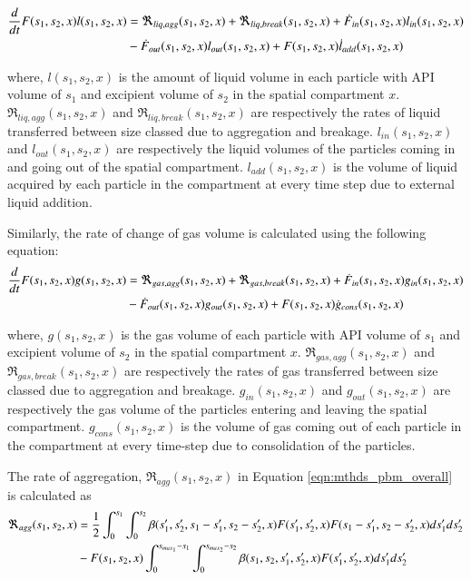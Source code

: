 \documentclass[preprint,11pt,authoryear]{elsarticle}
\begin{document}
\begin{align}
\frac{d}{dt}F(s_1,s_2,x)l(s_1,s_2,x)&= 
\Re_{liq,agg}(s_1,s_2,x)+\Re_{liq,break}(s_1,s_2,x)+\dot{F}_{in}(s_1,s_2,x)l_{in}(s_1,s_2,x)\notag\\
&-\dot{F}_{out}(s_1,s_2,x)l_{out}(s_1,s_2,x)+F(s_1,s_2,x)\dot{l}_{add}(s_1,s_2,x)
\end{align}

\par where, $l(s_1,s_2,x)$ is the amount of liquid volume in each particle with API volume of $s_1$ and 
excipient volume of $s_2$ in the spatial compartment $x$. $\Re_{liq,agg}(s_1,s_2,x)$ and 
$\Re_{liq,break}(s_1,s_2,x)$ are respectively the rates of liquid transferred between size classed due to 
aggregation and breakage. $l_{in}(s_1,s_2,x)$ and $l_{out}(s_1,s_2,x)$ are respectively the liquid 
volumes of the particles coming in and going out of the spatial compartment. $l_{add}(s_1,s_2,x)$ is 
the volume of liquid acquired by each particle in the compartment at every time step due to external 
liquid addition. 
\par Similarly, the rate of change of gas volume is calculated using the following equation: 
\begin{align}
\frac{d}{dt}F(s_1,s_2,x)g(s_1,s_2,x)&= 
\Re_{gas,agg}(s_1,s_2,x)+\Re_{gas,break}(s_1,s_2,x)+\dot{F}_{in}(s_1,s_2,x)g_{in}(s_1,s_2,x)\notag\\
&-\dot{F}_{out}(s_1,s_2,x)g_{out}(s_1,s_2,x)+F(s_1,s_2,x)\dot{g}_{cons}(s_1,s_2,x)
\end{align}

\par where, $g(s_1,s_2,x)$ is the gas volume of each particle with API volume of $s_1$ and excipient 
volume of $s_2$ in the spatial compartment $x$. $\Re_{gas,agg}(s_1,s_2,x)$ and 
$\Re_{gas,break}(s_1,s_2,x)$ are respectively the rates of gas transferred between size classed due to 
aggregation and breakage. $g_{in}(s_1,s_2,x)$ and $g_{out}(s_1,s_2,x)$ are respectively the gas 
volume of the particles entering and leaving the spatial compartment. $g_{cons}(s_1,s_2,x)$ is the 
volume of gas coming out of each particle in the compartment at every time-step due to consolidation 
of the particles. 
\par The rate of aggregation, $\Re_{agg}(s_1,s_2,x)$ in Equation \ref{eqn:mthds_pbm_overall} is 
calculated as  
\begin{align}
\Re_{agg}(s_1,s_2,x)&= \frac{1}{2}\int _0^{s_1} \int_0^{s_2} 
\beta(s_1',s_2',s_1-s_1',s_2-s_2',x)F(s_1',s_2',x)F(s_1-s_1',s_2-s_2',x)ds_1'ds_2'\notag\\ 
&- F(s_1,s_2,x)\int _0^{s_{max_1}-s_1} \int_0^{s_{max_2}-s_2} 
\beta(s_1,s_2,s_1',s_2',x)F(s_1',s_2',x)ds_1'ds_2'
\end{align}
\end{document}
